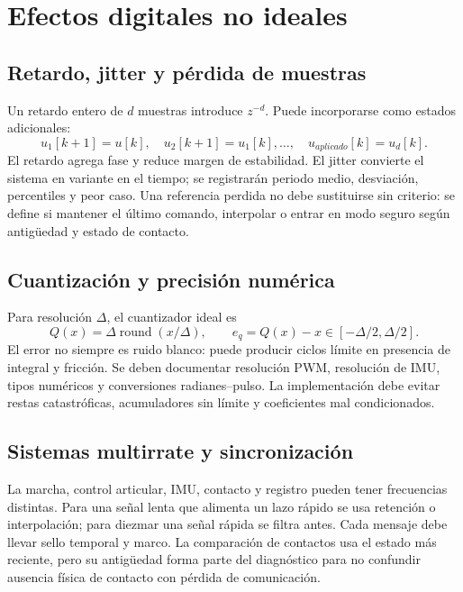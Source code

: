 \documentclass[11pt,letterpaper]{article}
\begin{document}
\section{Efectos digitales no ideales}
\subsection{Retardo, jitter y pérdida de muestras}
Un retardo entero de $d$ muestras introduce $z^{-d}$. Puede incorporarse como
estados adicionales:
\begin{equation}
 u_1[k+1]=u[k],\quad u_2[k+1]=u_1[k],\ldots,
 \quad u_{aplicado}[k]=u_d[k].
\end{equation}
El retardo agrega fase y reduce margen de estabilidad. El jitter convierte el
sistema en variante en el tiempo; se registrarán periodo medio, desviación,
percentiles y peor caso. Una referencia perdida no debe sustituirse sin
criterio: se define si mantener el último comando, interpolar o entrar en modo
seguro según antigüedad y estado de contacto.

\subsection{Cuantización y precisión numérica}
Para resolución $\Delta$, el cuantizador ideal es
\begin{equation}
 Q(x)=\Delta\operatorname{round}(x/\Delta),\qquad
 e_q=Q(x)-x\in[-\Delta/2,\Delta/2].
\end{equation}
El error no siempre es ruido blanco: puede producir ciclos límite en presencia
de integral y fricción. Se deben documentar resolución PWM, resolución de IMU,
tipos numéricos y conversiones radianes--pulso. La implementación debe evitar
restas catastróficas, acumuladores sin límite y coeficientes mal condicionados.

\subsection{Sistemas multirrate y sincronización}
La marcha, control articular, IMU, contacto y registro pueden tener frecuencias
distintas. Para una señal lenta que alimenta un lazo rápido se usa retención o
interpolación; para diezmar una señal rápida se filtra antes. Cada mensaje debe
llevar sello temporal y marco. La comparación de contactos usa el estado más
reciente, pero su antigüedad forma parte del diagnóstico para no confundir
ausencia física de contacto con pérdida de comunicación.
\end{document}
